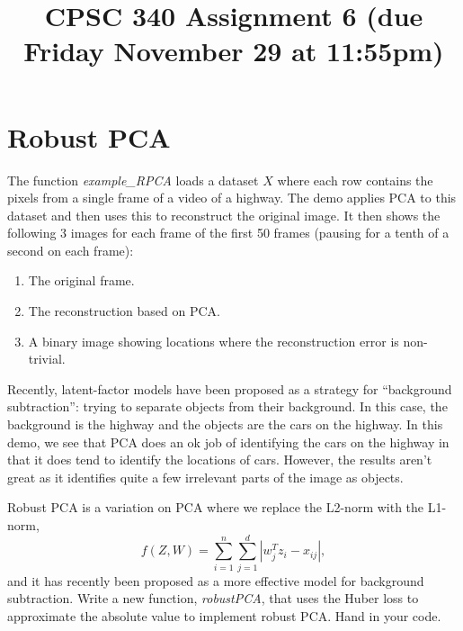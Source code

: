 \documentclass{article}
\def\blu#1{{\color{blu}#1}}
\def\enum#1{\begin{enumerate}#1\end{enumerate}}
\begin{document}
\title{CPSC 340 Assignment 6 (due Friday November 29 at 11:55pm)}
\author{}
\date{}
\maketitle
\vspace{-4em}


\section{Robust PCA}


The function \emph{example\_RPCA} loads a dataset $X$ where each row contains the pixels from a single frame of a video of a highway. The demo applies PCA to this dataset and then uses this to reconstruct the original image. It then shows the following 3 images for each frame of the first 50 frames (pausing for a tenth of a second on each frame):
\enum{
\item The original frame.
\item The reconstruction based on PCA.
\item A binary image showing locations where the reconstruction error is non-trivial.
}
Recently, latent-factor models have been proposed as a strategy for ``background subtraction'': trying to separate objects from their background. In this case, the background is the highway and the objects are the cars on the highway. In this demo, we see that PCA does an ok job of identifying the cars on the highway in that it does tend to identify the locations of cars. However, the results aren't great as it identifies quite a few irrelevant parts of the image as objects.

Robust PCA is a variation on PCA where we replace the L2-norm with the L1-norm,
\[
f(Z,W) = \sum_{i=1}^n\sum_{j=1}^d |w_j^Tz_i - x_{ij}|,
\]
and it has recently been proposed as a more effective model for background subtraction. \blu{Write a new function, \emph{robustPCA}, that uses the Huber loss to approximate the absolute value to implement robust PCA. Hand in your code.}
\end{document}

